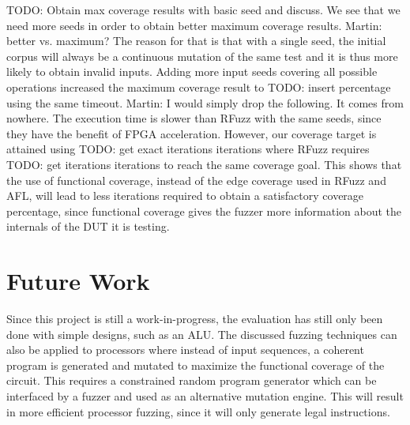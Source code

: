 \documentclass[conference]{IEEEtran}
\newcommand{\todo}[1]{{\color{olive} TODO: #1}}
\newcommand{\martin}[1]{{\color{blue} Martin: #1}}
\begin{document}
\todo{Obtain max coverage results with basic seed and discuss.}
We see that we need more seeds in order to obtain better maximum coverage results.
\martin{better vs. maximum?}
The reason for that is that with a single seed, the initial corpus will always be a continuous mutation of the same test and it is thus more likely to obtain invalid inputs.
Adding more input seeds covering all possible operations increased the maximum coverage result to \todo{insert percentage} using the same timeout.
\martin{I would simply drop the following. It comes from nowhere.}
The execution time is slower than RFuzz with the same seeds, since they have the benefit of FPGA acceleration.
However, our coverage target is attained using \todo{get exact iterations} iterations where RFuzz requires \todo{get iterations} iterations to reach the same coverage goal.
This shows that the use of functional coverage, instead of the edge coverage used in RFuzz and AFL, will lead to less iterations required to obtain a satisfactory coverage percentage, since functional coverage gives the fuzzer more information about the internals of the DUT it is testing.

\section{Future Work}
Since this project is still a work-in-progress, the evaluation has still only been done with simple designs, such as an ALU.
The discussed fuzzing techniques can also be applied to processors where instead of input sequences, a coherent program is generated and mutated to maximize the functional coverage of the circuit. 
This requires a constrained random program generator which can be interfaced by a fuzzer and used as an alternative mutation engine.
This will result in more efficient processor fuzzing, since it will only generate legal instructions. 
\end{document}
